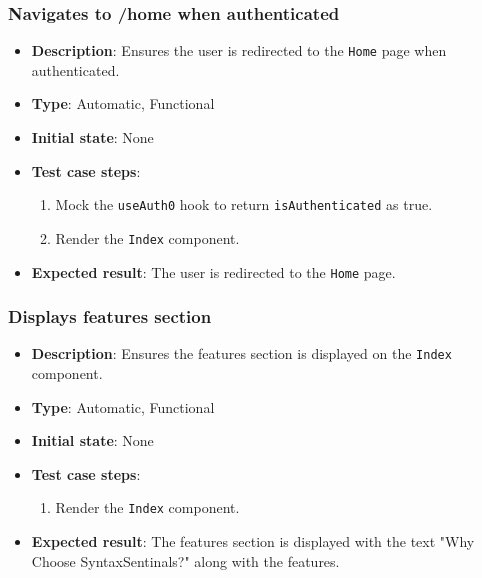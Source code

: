 \documentclass[12pt, titlepage]{article}
\begin{document}
\subsubsection{Navigates to /home when authenticated}
\begin{itemize}
    \item \textbf{Description}: Ensures the user is redirected to the \texttt{Home} page when authenticated.
    \item \textbf{Type}: Automatic, Functional
    \item \textbf{Initial state}: None
    \item \textbf{Test case steps}:
    \begin{enumerate}
        \item Mock the \texttt{useAuth0} hook to return \texttt{isAuthenticated} as true.
        \item Render the \texttt{Index} component.
    \end{enumerate}
    \item \textbf{Expected result}: The user is redirected to the \texttt{Home} page.
\end{itemize}

\subsubsection{Displays features section}
\begin{itemize}
    \item \textbf{Description}: Ensures the features section is displayed on the \texttt{Index} component.
    \item \textbf{Type}: Automatic, Functional
    \item \textbf{Initial state}: None
    \item \textbf{Test case steps}:
    \begin{enumerate}
        \item Render the \texttt{Index} component.
    \end{enumerate}
    \item \textbf{Expected result}: The features section is displayed with the text "Why Choose SyntaxSentinals?" along with the features.
\end{itemize}
\end{document}
